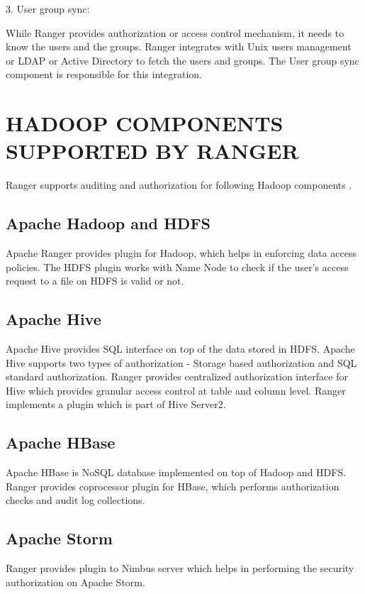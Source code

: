 \documentclass[9pt,twocolumn,twoside]{styles/osajnl}
\begin{document}
3. User group sync:

While Ranger provides authorization or access control mechanism, it needs to
know the users and the groups. Ranger integrates with Unix users management or
LDAP or Active Directory to fetch the users and groups. The User group sync
component is responsible for this integration.

\section{HADOOP COMPONENTS SUPPORTED BY RANGER}

Ranger supports auditing and authorization for following Hadoop components
\cite{www-ranger-faq}.

\subsection{Apache Hadoop and HDFS}

Apache Ranger provides plugin for Hadoop, which helps in enforcing data access
policies. The HDFS plugin works with Name Node to check if the user's access
request to a file on HDFS is valid or not.

\subsection{Apache Hive}

Apache Hive provides SQL interface on top of the data stored in HDFS. Apache
Hive supports two types of authorization - Storage based authorization and
SQL standard authorization. Ranger provides centralized authorization
interface for Hive which provides granular access control at table and column
 level. Ranger implements a plugin which is part of Hive Server2.

\subsection{Apache HBase}
Apache HBase is NoSQL database implemented on top of Hadoop and HDFS. Ranger
provides coprocessor plugin for HBase, which performs authorization checks and
 audit log collections.

\subsection{Apache Storm}
Ranger provides plugin to Nimbus server which helps in performing the
security authorization on Apache Storm.
\end{document}
